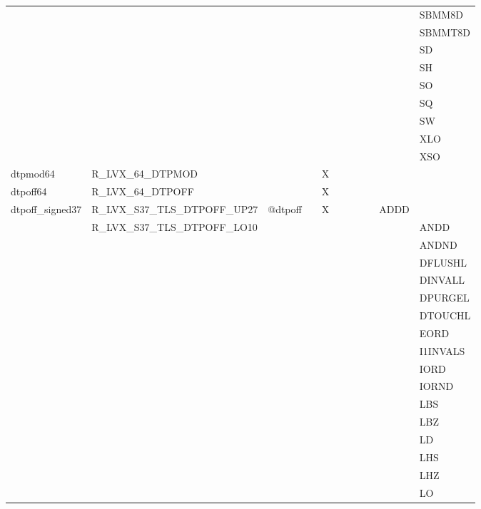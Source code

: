 {\begin{tabular}{|l|l|l|l|l|l|l|l|l|l|l|}
 & & & & & & & & & & \textsf{SBMM8D} \\
 & & & & & & & & & & \textsf{SBMMT8D} \\
 & & & & & & & & & & \textsf{SD} \\
 & & & & & & & & & & \textsf{SH} \\
 & & & & & & & & & & \textsf{SO} \\
 & & & & & & & & & & \textsf{SQ} \\
 & & & & & & & & & & \textsf{SW} \\
 & & & & & & & & & & \textsf{XLO} \\
 & & & & & & & & & & \textsf{XSO} \\
\hline
\textsf{dtpmod64} & \textsf{R\_LVX\_64\_DTPMOD} & \textsf{} & \textsf{} & \textsf{X} & \textsf{} & \textsf{} & \textsf{} & \textsf{} & \textsf{} \\
\hline
\textsf{dtpoff64} & \textsf{R\_LVX\_64\_DTPOFF} & \textsf{} & \textsf{} & \textsf{X} & \textsf{} & \textsf{} & \textsf{} & \textsf{} & \textsf{} \\
\hline
\textsf{dtpoff\_signed37} & \textsf{R\_LVX\_S37\_TLS\_DTPOFF\_UP27} & \textsf{@dtpoff} & \textsf{} & \textsf{X} & \textsf{} & \textsf{} & \textsf{} & \textsf{} & \textsf{ADDD} \\
 & \textsf{R\_LVX\_S37\_TLS\_DTPOFF\_LO10} & & & & & & & & & \textsf{ANDD} \\
 & & & & & & & & & & \textsf{ANDND} \\
 & & & & & & & & & & \textsf{DFLUSHL} \\
 & & & & & & & & & & \textsf{DINVALL} \\
 & & & & & & & & & & \textsf{DPURGEL} \\
 & & & & & & & & & & \textsf{DTOUCHL} \\
 & & & & & & & & & & \textsf{EORD} \\
 & & & & & & & & & & \textsf{I1INVALS} \\
 & & & & & & & & & & \textsf{IORD} \\
 & & & & & & & & & & \textsf{IORND} \\
 & & & & & & & & & & \textsf{LBS} \\
 & & & & & & & & & & \textsf{LBZ} \\
 & & & & & & & & & & \textsf{LD} \\
 & & & & & & & & & & \textsf{LHS} \\
 & & & & & & & & & & \textsf{LHZ} \\
 & & & & & & & & & & \textsf{LO} \\

\end{tabular}}
